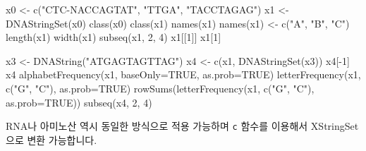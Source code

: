 \documentclass[
]{book}
\newenvironment{Shaded}{\begin{snugshade}}{\end{snugshade}}
\newcommand{\AttributeTok}[1]{\textcolor[rgb]{0.77,0.63,0.00}{#1}}
\newcommand{\ConstantTok}[1]{\textcolor[rgb]{0.00,0.00,0.00}{#1}}
\newcommand{\DecValTok}[1]{\textcolor[rgb]{0.00,0.00,0.81}{#1}}
\newcommand{\FunctionTok}[1]{\textcolor[rgb]{0.00,0.00,0.00}{#1}}
\newcommand{\NormalTok}[1]{#1}
\newcommand{\OtherTok}[1]{\textcolor[rgb]{0.56,0.35,0.01}{#1}}
\newcommand{\SpecialCharTok}[1]{\textcolor[rgb]{0.00,0.00,0.00}{#1}}
\newcommand{\StringTok}[1]{\textcolor[rgb]{0.31,0.60,0.02}{#1}}
\begin{document}
\begin{Shaded}
\begin{Highlighting}[]

\NormalTok{x0 }\OtherTok{\textless{}{-}} \FunctionTok{c}\NormalTok{(}\StringTok{"CTC{-}NACCAGTAT"}\NormalTok{, }\StringTok{"TTGA"}\NormalTok{, }\StringTok{"TACCTAGAG"}\NormalTok{)}
\NormalTok{x1 }\OtherTok{\textless{}{-}} \FunctionTok{DNAStringSet}\NormalTok{(x0)}
\FunctionTok{class}\NormalTok{(x0)}
\FunctionTok{class}\NormalTok{(x1)}
\FunctionTok{names}\NormalTok{(x1)}
\FunctionTok{names}\NormalTok{(x1) }\OtherTok{\textless{}{-}} \FunctionTok{c}\NormalTok{(}\StringTok{"A"}\NormalTok{, }\StringTok{"B"}\NormalTok{, }\StringTok{"C"}\NormalTok{)}
\FunctionTok{length}\NormalTok{(x1)}
\FunctionTok{width}\NormalTok{(x1)}
\FunctionTok{subseq}\NormalTok{(x1, }\DecValTok{2}\NormalTok{, }\DecValTok{4}\NormalTok{)}
\NormalTok{x1[[}\DecValTok{1}\NormalTok{]]}
\NormalTok{x1[}\DecValTok{1}\NormalTok{]}


\NormalTok{x3 }\OtherTok{\textless{}{-}} \FunctionTok{DNAString}\NormalTok{(}\StringTok{"ATGAGTAGTTAG"}\NormalTok{)}
\NormalTok{x4 }\OtherTok{\textless{}{-}} \FunctionTok{c}\NormalTok{(x1, }\FunctionTok{DNAStringSet}\NormalTok{(x3))}
\NormalTok{x4[}\SpecialCharTok{{-}}\DecValTok{1}\NormalTok{]}
\NormalTok{x4}
\FunctionTok{alphabetFrequency}\NormalTok{(x1, }\AttributeTok{baseOnly=}\ConstantTok{TRUE}\NormalTok{, }\AttributeTok{as.prob=}\ConstantTok{TRUE}\NormalTok{)}
\FunctionTok{letterFrequency}\NormalTok{(x1, }\FunctionTok{c}\NormalTok{(}\StringTok{"G"}\NormalTok{, }\StringTok{"C"}\NormalTok{), }\AttributeTok{as.prob=}\ConstantTok{TRUE}\NormalTok{)}
\FunctionTok{rowSums}\NormalTok{(}\FunctionTok{letterFrequency}\NormalTok{(x1, }\FunctionTok{c}\NormalTok{(}\StringTok{"G"}\NormalTok{, }\StringTok{"C"}\NormalTok{), }\AttributeTok{as.prob=}\ConstantTok{TRUE}\NormalTok{))}
\FunctionTok{subseq}\NormalTok{(x4, }\DecValTok{2}\NormalTok{, }\DecValTok{4}\NormalTok{)}
\end{Highlighting}
\end{Shaded}

RNA나 아미노산 역시 동일한 방식으로 적용 가능하며 \texttt{c} 함수를 이용해서 XStringSet으로 변환 가능합니다.
\end{document}
